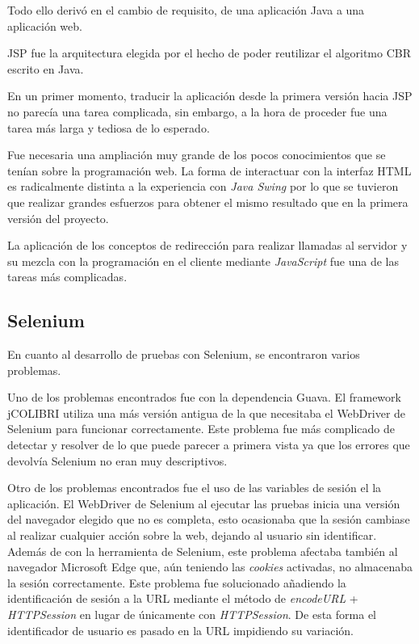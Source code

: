 Todo ello derivó en el cambio de requisito, de una aplicación Java a una aplicación web.

JSP fue la arquitectura elegida por el hecho de poder reutilizar el algoritmo CBR escrito en Java.

En un primer momento, traducir la aplicación desde la primera versión hacia JSP no parecía una tarea complicada, sin embargo, a la hora de proceder fue una tarea más larga y tediosa de lo esperado.

Fue necesaria una ampliación muy grande de los pocos conocimientos que se tenían sobre la programación web. La forma de interactuar con la interfaz HTML es radicalmente distinta a la experiencia con \emph{Java Swing} por lo que se tuvieron que realizar grandes esfuerzos para obtener el mismo resultado que en la primera versión del proyecto.

La aplicación de los conceptos de redirección para realizar llamadas al servidor y su mezcla con la programación en el cliente mediante \emph{JavaScript} fue una de las tareas más complicadas.

\subsection{Selenium}

En cuanto al desarrollo de pruebas con Selenium, se encontraron varios problemas.

Uno de los problemas encontrados fue con la dependencia Guava. El framework jCOLIBRI utiliza una más versión antigua de la que necesitaba el WebDriver de Selenium para funcionar correctamente. Este problema fue más complicado de detectar y resolver de lo que puede parecer a primera vista ya que los errores que devolvía Selenium no eran muy descriptivos.

Otro de los problemas encontrados fue el uso de las variables de sesión el la aplicación. El WebDriver de Selenium al ejecutar las pruebas inicia una versión del navegador elegido que no es completa, esto ocasionaba que la sesión cambiase al realizar cualquier acción sobre la web, dejando al usuario sin identificar. Además de con la herramienta de Selenium, este problema afectaba también al navegador Microsoft Edge que, aún teniendo las \emph{cookies} activadas, no almacenaba la sesión correctamente. Este problema fue solucionado añadiendo la identificación de sesión a la URL mediante el método de \emph{encodeURL} + \emph{HTTPSession} en lugar de únicamente con \emph{HTTPSession}. De esta forma el identificador de usuario es pasado en la URL impidiendo su variación.

